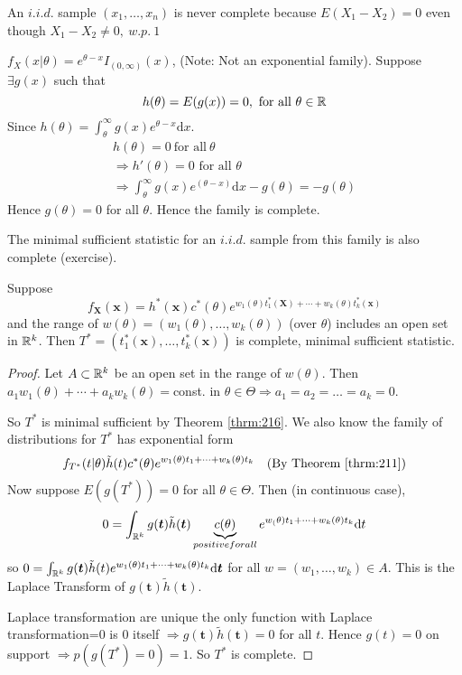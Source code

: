 \documentclass[english, 11pt]{article}
\begin{document}
\begin{exmp}
An $i.i.d.$ sample $(x_1, \dots, x_n)$ is never complete because $E(X_1-X_2)=0$ even though $X_1-X_2\not=0,~w.p.~1$
\end{exmp}
\begin{exmp}
$f_{X}(x|\theta)=e^{\theta-x}I_{(0, \infty)}(x)$, (Note: Not an exponential family). Suppose $\exists g(x)$ such that 
$$
h(\theta)=E(g(x))=0, \text{  for all }\theta\in{\mathbb{R}}
$$
Since $h(\theta)=\int_{\theta}^\infty g(x)e^{\theta-x}\mathrm{d}x$.
$$
\begin{aligned}
h(\theta)=0~\text{for all}~\theta\\
\Rightarrow h'(\theta)=0\text{ for all }\theta\\
\Rightarrow \int_{\theta}^\infty g(x)e^{(\theta-x)}\mathrm{d}x-g(\theta)=-g(\theta)
\end{aligned}
$$
Hence $g(\theta)=0$ for all $\theta$. Hence the family is complete.
\end{exmp} 

The minimal sufficient statistic for an $i.i.d.$ sample from this family is also complete (exercise).

\begin{thrm}
Suppose 
$$
f_{\bm{X}}(\bm{x})=h^*(\bm{x})c^*(\theta)e^{w_1(\theta)t_1^*(\bm{X})+\cdots+w_k(\theta)t^*_k(\bm{x})}
$$
and the range of $w(\theta)=(w_1(\theta), \dots, w_k(\theta))$ (over $\theta$) includes an open set in ${\mathbb{R}}^k$. Then $T^*=(t^*_1(\bm{x}), \dots, t^*_k(\bm{x}))$ is complete, minimal sufficient statistic.
\end{thrm}
\begin{proof}
Let $A\subset {\mathbb{R}}^k$ be an open set in the range of $w(\theta)$. Then $a_1w_1(\theta)+\cdots+a_kw_k(\theta)=$const. in $\theta\in\Theta\Rightarrow a_1=a_2=\dots=a_k=0$. 

So $T^*$ is minimal sufficient by Theorem \ref{thrm:216}. We also know the family of distributions for $T^*$ has exponential form
$$
f_{T^*}(t|\theta)\tilde{h}(t)c^*(\theta)e^{w_1(\theta)t_1+\cdots+w_k(\theta)t_k}\quad\text{(By Theorem \ref{thrm:211})}
$$
Now suppose $E(g(T^*))=0$ for all $\theta\in\Theta$. Then (in continuous case),
$$
0=\int_{{\mathbb{R}}^k} g(\bm{t})\tilde{h}(\bm{t})\underbrace{c(\theta)}_{positive for all }e^{w_(\theta)t_1+\cdots+w_k(\theta)t_k}\mathrm{d}t
$$
so $0=\int_{{\mathbb{R}}^k} g(\bm{t})\tilde{h}(t)e^{w_1(\theta)t_1+\cdots+w_k(\theta)t_k}\mathrm{d}\bm{t}$ for all $w=(w_1, \dots, w_k)\in A$. This is the Laplace Transform of $g(\bm{t})\tilde{h}(\bm{t})$. 

Laplace transformation are unique the only function with Laplace transformation=0 is 0 itself $\Rightarrow g(\bm{t})\tilde{h}(\bm{t})=0$ for all $t$. Hence $g(t)=0$ on support $\Rightarrow p(g(T^*)=0)=1$. So $T^*$ is complete.
\end{proof}
\end{document}
